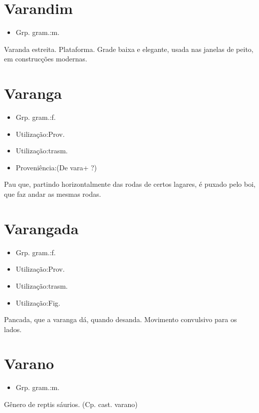 \documentclass{article}
\begin{document}
\section{Varandim}
\begin{itemize}
\item {Grp. gram.:m.}
\end{itemize}
Varanda estreita.
Plataforma.
Grade baixa e elegante, usada nas janelas de peito, em construcções modernas.
\section{Varanga}
\begin{itemize}
\item {Grp. gram.:f.}
\end{itemize}
\begin{itemize}
\item {Utilização:Prov.}
\end{itemize}
\begin{itemize}
\item {Utilização:trasm.}
\end{itemize}
\begin{itemize}
\item {Proveniência:(De \textunderscore vara\textunderscore  + \textunderscore ?\textunderscore )}
\end{itemize}
Pau que, partindo horizontalmente das rodas de certos lagares, é puxado pelo boi, que faz andar as mesmas rodas.
\section{Varangada}
\begin{itemize}
\item {Grp. gram.:f.}
\end{itemize}
\begin{itemize}
\item {Utilização:Prov.}
\end{itemize}
\begin{itemize}
\item {Utilização:trasm.}
\end{itemize}
\begin{itemize}
\item {Utilização:Fig.}
\end{itemize}
Pancada, que a varanga dá, quando desanda.
Movimento convulsivo para os lados.
\section{Varano}
\begin{itemize}
\item {Grp. gram.:m.}
\end{itemize}
Gênero de reptis sáurios.
(Cp. cast. \textunderscore varano\textunderscore )
\end{document}
